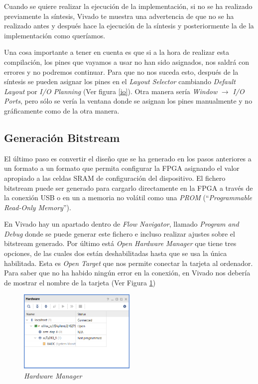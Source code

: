 Cuando se quiere realizar la ejecución de la implementación, si no se ha realizado previamente la síntesis,
Vivado te muestra una advertencia de que no se ha realizado antes y después hace la ejecución de la síntesis 
y posteriormente la de la implementación como queríamos.

Una cosa importante a tener en cuenta es que si a la hora de realizar esta compilación, los pines que vayamos a 
usar no han sido asignados, nos saldrá con errores y no podremos continuar. Para que no nos suceda esto, después 
de la síntesis se pueden asignar los pines en el \textit{Layout Selector} cambiando \textit{Default Layout} por 
\textit{I/O Planning} (Ver figura \ref{io}). Otra manera sería \textit{Window} $\rightarrow$ \textit{I/O Ports}, 
pero sólo se vería la ventana donde se asignan los pines manualmente y no gráficamente como de la otra manera.

\subsection{Generación Bitstream}

El último paso es convertir el diseño que se ha generado en los pasos anteriores a un formato a un formato que 
permita configurar la FPGA asignando el valor apropiado a las celdas SRAM de configuración del dispositivo. 
El fichero bitstream puede ser generado para cargarlo directamente en la FPGA a través de 
la conexión USB o en un a memoria no volátil como una \textit{PROM} (``\textit{Programmable Read-Only Memory}'').

En Vivado hay un apartado dentro de \textit{Flow Navigator}, llamado \textit{Program and Debug} donde se puede 
generar este fichero e incluso realizar ajustes sobre el bitstream generado. Por último está \textit{Open Hardware Manager} 
que tiene tres opciones, de las cuales dos están deshabilitadas hasta que se usa la única habilitada. Esta es 
\textit{Open Target} que nos permite conectar la tarjeta al ordenador. Para saber que no ha habido ningún error 
en la conexión, en Vivado nos debería de mostrar el nombre de la tarjeta (Ver Figura \ref{hardware})

\begin{figure}[H]
    \centering
    \includegraphics[width = 0.5\textwidth]{imagenes/hardware.png}
    \caption{\textit{Hardware Manager}}\label{hardware}
\end{figure}


